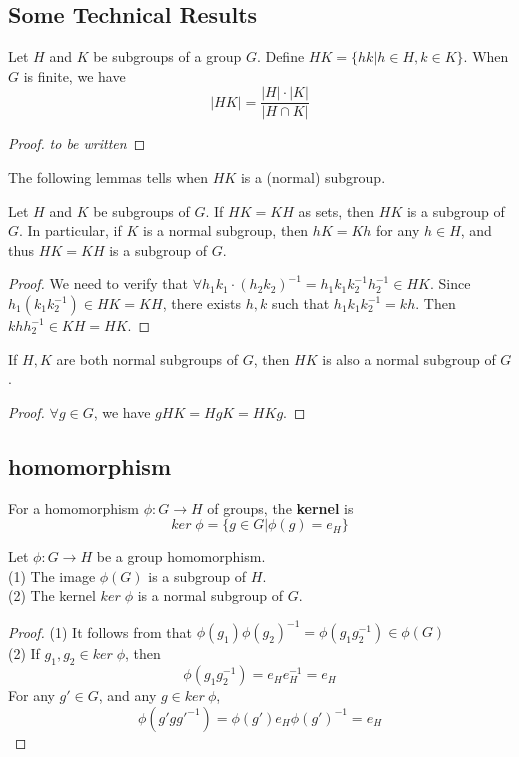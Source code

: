 \documentclass[11pt,fleqn]{book} %
\begin{document}
\begin{CJK}{UTF8}{gkai}
\subsection{Some Technical Results}
\begin{proposition}
	Let $H$ and $K$ be subgroups of a group $G$. Define $HK = \{hk | h\in H, k\in K\}$. When $G$ is finite, we have 
	\[|HK| = \frac {|H| \cdot |K|} {|H \cap K|}\]
\end{proposition}

\begin{proof}
	{\it to be written}
\end{proof}

The following lemmas tells when $HK$ is a (normal) subgroup.
\begin{lemma}
	Let $H$ and $K$ be subgroups of $G$. If $HK = KH$ as sets, then $HK$ is a subgroup of $G$.
	In particular, if $K$ is a normal subgroup, then $hK = Kh$ for any $h \in H$, and thus $HK = KH$ is a subgroup of $G$.
\end{lemma}
\begin{proof}
	We need to verify that $\forall h_1k_1 \cdot (h_2k_2)^{-1} = h_1k_1k_2^{-1}h_2^{-1}\in HK$. Since $h_1(k_1k_2^{-1}) \in HK = KH$, there exists $h,k$ such that $h_1k_1k_2^{-1} = kh$. 
	Then $khh_2^{-1} \in KH = HK$.
\end{proof}

\begin{lemma}
	If $H, K$ are both normal subgroups of $G$, then $HK$ is also a normal subgroup of $G$.
\end{lemma}
\begin{proof}
	$\forall g \in G$, we have $gHK = HgK = HKg$. 	
\end{proof}

\subsection{homomorphism}
\begin{definition}
	 For a homomorphism $\phi: G \to H$ of groups, the {\bf kernel} is 
	\[ker \;\phi = \{g \in G | \phi(g) = e_H\}\]
\end{definition}

\begin{lemma}
	Let $\phi:G\to H$ be a group homomorphism. \\
	(1) The image $\phi(G)$ is a subgroup of $H$. \\
	(2) The kernel $ker \; \phi$ is a normal subgroup of $G$.
\end{lemma}
\begin{proof}
	(1) It follows from that $\phi(g_1)\phi(g_2)^{-1} = \phi(g_1g_2^{-1}) \in \phi(G)$ \\
	(2) If $g_1, g_2 \in ker \; \phi$, then 
	\[\phi(g_1g_2^{-1}) = e_He_H^{-1} = e_H\]
	For any $g' \in G$, and any $g \in ker \ \phi$, \[\phi(g'gg'^{-1}) = \phi(g')e_H\phi(g')^{-1} = e_H\]  
\end{proof}


\end{CJK}
\end{document}
